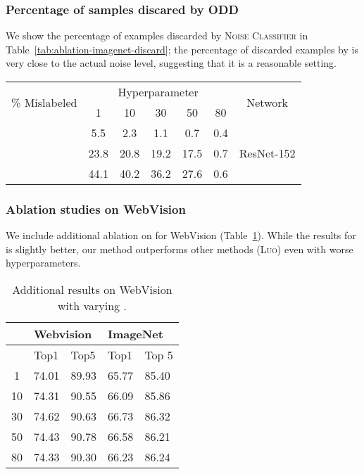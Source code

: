\documentclass[a4paper,11pt]{article}
\begin{document}
\subsubsection{Percentage of samples discared by \textsc{ODD}} We show the percentage of examples discarded by \textsc{Noise Classifier} in Table~\ref{tab:ablation-imagenet-discard}; the percentage of discarded examples by  is very close to the actual noise level, suggesting that it is a reasonable setting. 

\begin{table*}[htbp]
\begin{center}
\caption{Percentage of example discraded by \textsc{ODD} on ImageNet-2012.}
\label{tab:ablation-imagenet-discard}
\begin{tabular}{c|ccccc|c}
\toprule
\multirow{2}{*}{\% Mislabeled}  & \multicolumn{5}{|c|}{Hyperparameter } & \multirow{2}{*}{Network}
\\
& 1 & 10 & 30 & 50 & 80 & \\\midrule
 & 5.5 & 2.3 & 1.1 & 0.7 & 0.4 & \multirow{3}{*}{ResNet-152} \\
 & 23.8 & 20.8 & 19.2 & 17.5 & 0.7 &\\
 & 44.1 & 40.2 & 36.2 & 27.6 & 0.6  & \\
\bottomrule
\end{tabular}
\end{center}
\end{table*}







\subsubsection{Ablation studies on WebVision} We include additional ablation on  for WebVision (Table~\ref{tab:wv}). While the results for  is slightly better, our method outperforms other methods (\textsc{Luo}) even with worse hyperparameters.

\begin{table}
\centering
\caption{Additional results on WebVision with varying .}
\vspace{1em}
\begin{tabular}{cllll}
\toprule
  & \multicolumn{2}{l}{Webvision}      & \multicolumn{2}{l}{ImageNet}                 \\ \midrule
                   & Top1      & Top5  & Top1  & Top 5\\\midrule
1               & 74.01     & 89.93 & 65.77    & 85.40        \\
10              & 74.31     & 90.55 & 66.09    & 85.86       \\
30              & 74.62     & 90.63 & 66.73    & 86.32        \\
50              & 74.43     & 90.78 & 66.58    & 86.21        \\
80              & 74.33      & 90.30 & 66.23    & 86.24       \\ \bottomrule
\end{tabular}
\label{tab:wv}
\end{table}
\end{document}
